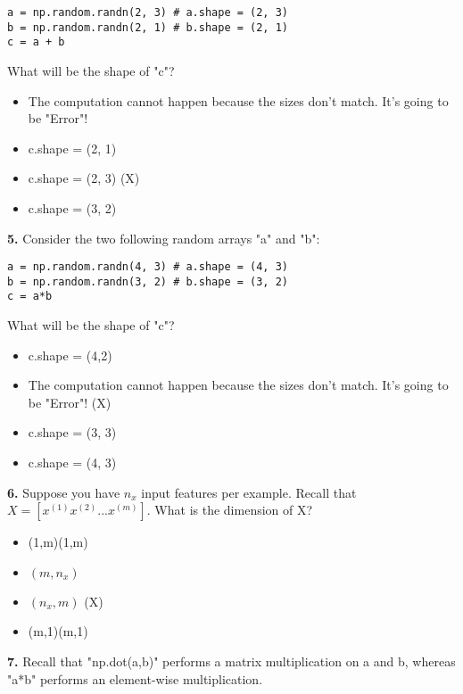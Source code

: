 \begin{lstlisting}
a = np.random.randn(2, 3) # a.shape = (2, 3)
b = np.random.randn(2, 1) # b.shape = (2, 1)
c = a + b
\end{lstlisting}
What will be the shape of "c"?
\begin{itemize}
    \item The computation cannot happen because the sizes don't match. It's going to be "Error"!
    \item c.shape = (2, 1)
    \item c.shape = (2, 3) (X)
    \item c.shape = (3, 2)
\end{itemize}
\textbf{5.} Consider the two following random arrays "a" and "b":
\begin{lstlisting}
a = np.random.randn(4, 3) # a.shape = (4, 3)
b = np.random.randn(3, 2) # b.shape = (3, 2)
c = a*b
\end{lstlisting}
What will be the shape of "c"?
\begin{itemize}
    \item c.shape = (4,2)
    \item The computation cannot happen because the sizes don't match. It's going to be "Error"! (X)
    \item c.shape = (3, 3)
    \item c.shape = (4, 3)
\end{itemize}
\textbf{6.} Suppose you have $n_x$ input features per example. Recall that $X = [x^{(1)} x^{(2)} ... x^{(m)}]$. What is the dimension of X?
\begin{itemize}
    \item (1,m)(1,m)
    \item $(m,n_x)$
    \item $(n_x, m)$ (X)
    \item (m,1)(m,1)
\end{itemize}
\textbf{7.} Recall that "np.dot(a,b)" performs a matrix multiplication on a and b, whereas "a*b" performs an element-wise multiplication.

